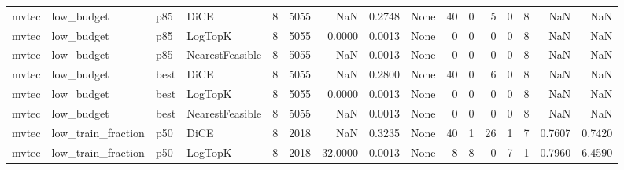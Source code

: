 \begin{tabular}{llllrrrrlrrrrrrr}
  mvtec &           low\_budget &    p85 &            DiCE &            8 &                 5055 &                      NaN &      0.2748 &                                               None &     40 &            0 &        5 &              0 &          8 &                NaN &            NaN \\
  mvtec &           low\_budget &    p85 &         LogTopK &            8 &                 5055 &                   0.0000 &      0.0013 &                                               None &      0 &            0 &        0 &              0 &          8 &                NaN &            NaN \\
  mvtec &           low\_budget &    p85 & NearestFeasible &            8 &                 5055 &                      NaN &      0.0013 &                                               None &      0 &            0 &        0 &              0 &          8 &                NaN &            NaN \\
  mvtec &           low\_budget &   best &            DiCE &            8 &                 5055 &                      NaN &      0.2800 &                                               None &     40 &            0 &        6 &              0 &          8 &                NaN &            NaN \\
  mvtec &           low\_budget &   best &         LogTopK &            8 &                 5055 &                   0.0000 &      0.0013 &                                               None &      0 &            0 &        0 &              0 &          8 &                NaN &            NaN \\
  mvtec &           low\_budget &   best & NearestFeasible &            8 &                 5055 &                      NaN &      0.0013 &                                               None &      0 &            0 &        0 &              0 &          8 &                NaN &            NaN \\
  mvtec &   low\_train\_fraction &    p50 &            DiCE &            8 &                 2018 &                      NaN &      0.3235 &                                               None &     40 &            1 &       26 &              1 &          7 &             0.7607 &         0.7420 \\
  mvtec &   low\_train\_fraction &    p50 &         LogTopK &            8 &                 2018 &                  32.0000 &      0.0013 &                                               None &      8 &            8 &        0 &              7 &          1 &             0.7960 &         6.4590 \\

\end{tabular}
